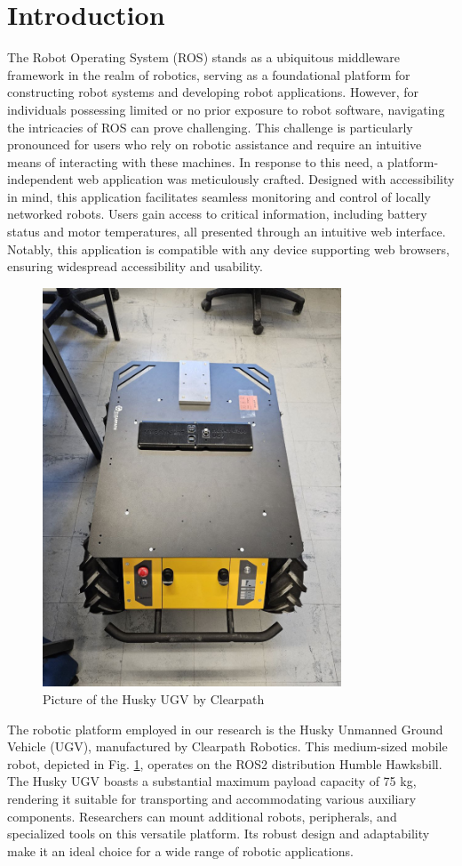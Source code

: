 \documentclass[conference]{IEEEtran}
\begin{document}
\section{Introduction}
The Robot Operating System (ROS) stands as a ubiquitous middleware framework in the realm of robotics, serving as a foundational platform for constructing robot systems and developing robot applications. 
However, for individuals possessing limited or no prior exposure to robot software, navigating the intricacies of ROS can prove challenging. 
This challenge is particularly pronounced for users who rely on robotic assistance and require an intuitive means of interacting with these machines.
In response to this need, a platform-independent web application was meticulously crafted. 
Designed with accessibility in mind, this application facilitates seamless monitoring and control of locally networked robots. Users gain access to critical information, including battery status and motor temperatures, all presented through an intuitive web interface. 
Notably, this application is compatible with any device supporting web browsers, ensuring widespread accessibility and usability.
\begin{figure}[htbp]
    \centerline{\includegraphics[width=8.9cm]{Pictures/husky_costum.jpeg}}
    \caption{Picture of the Husky UGV by Clearpath}
    \label{fig:huskyClearpath}
\end{figure} 
The robotic platform employed in our research is the Husky Unmanned Ground Vehicle (UGV), manufactured by Clearpath Robotics. This medium-sized mobile robot, depicted in Fig. \ref{fig:huskyClearpath}, operates on the ROS2 distribution Humble Hawksbill.
The Husky UGV boasts a substantial maximum payload capacity of 75 kg, rendering it suitable for transporting and accommodating various auxiliary components. Researchers can mount additional robots, peripherals, and specialized tools on this versatile platform. Its robust design and adaptability make it an ideal choice for a wide range of robotic applications\cite{huskyClearpath}. 
\end{document}
